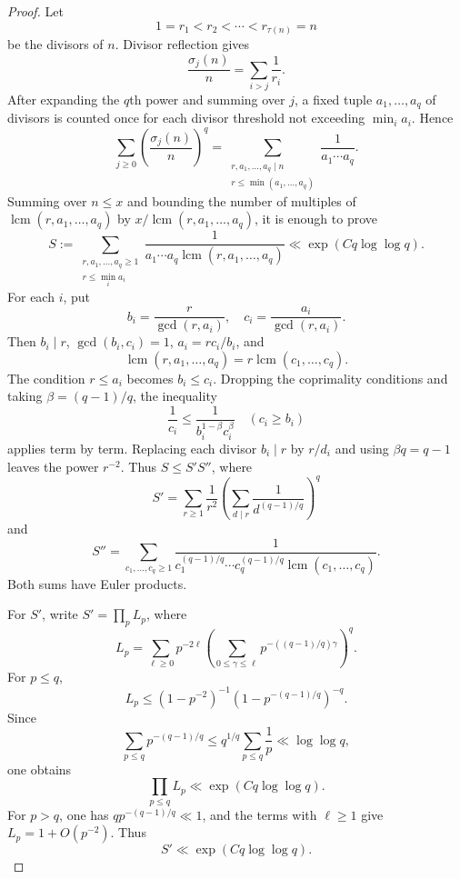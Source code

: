 \documentclass[11pt,letterpaper,reqno]{amsart}
\numberwithin{equation}{section}
\theoremstyle{remark}
\newcommand{\1}{\mathbf 1}
\DeclareMathOperator{\lcm}{lcm}
\renewcommand{\leq}{\leqslant}
\renewcommand{\geq}{\geqslant}
\begin{document}
\begin{proof}
Let
\[
 1=r_1<r_2<\cdots<r_{\tau(n)}=n
\]
be the divisors of $n$. Divisor reflection gives
\[
 \frac{\sigma_j(n)}n=\sum_{i>j}\frac1{r_i}.
\]
After expanding the $q$th power and summing over $j$, a fixed tuple
$a_1,\ldots,a_q$ of divisors is counted once for each divisor threshold not
exceeding $\min_i a_i$. Hence
\[
 \sum_{j\geq0}\left(\frac{\sigma_j(n)}n\right)^q
 =
 \sum_{\substack{r,a_1,\ldots,a_q\mid n\\
 r\leq\min(a_1,\ldots,a_q)}}
 \frac1{a_1\cdots a_q}.
\]
Summing over $n\leq x$ and bounding the number of multiples of
$\lcm(r,a_1,\ldots,a_q)$ by\linebreak
$x/\lcm(r,a_1,\ldots,a_q)$, it is enough to prove
\begin{equation}\label{eq:k-S}
 S:=\sum_{\substack{r,a_1,\ldots,a_q\geq1\\r\leq\min_i a_i}}
 \frac1{a_1\cdots a_q\lcm(r,a_1,\ldots,a_q)}
 \ll\exp(Cq\log\log q).
\end{equation}
For each $i$, put
\[
 b_i=\frac r{\gcd(r,a_i)},\quad c_i=\frac{a_i}{\gcd(r,a_i)}.
\]
Then $b_i\mid r$, $\gcd(b_i,c_i)=1$, $a_i=rc_i/b_i$, and
\[
 \lcm(r,a_1,\ldots,a_q)=r\lcm(c_1,\ldots,c_q).
\]
The condition $r\leq a_i$ becomes $b_i\leq c_i$. Dropping the coprimality
conditions and taking $\beta=(q-1)/q$, the inequality
\[
 \frac1{c_i}\leq\frac1{b_i^{1-\beta}c_i^\beta}
 \quad(c_i\geq b_i)
\]
applies term by term. Replacing each divisor $b_i\mid r$ by $r/d_i$
and using $\beta q=q-1$ leaves the power $r^{-2}$. Thus
$S\leq S'S''$, where
\[
 S'=\sum_{r\geq1}\frac1{r^2}
 \left(\sum_{d\mid r}\frac1{d^{(q-1)/q}}\right)^q
\]
and
\[
 S''=\sum_{c_1,\ldots,c_q\geq1}
 \frac1{c_1^{(q-1)/q}\cdots c_q^{(q-1)/q}\lcm(c_1,\ldots,c_q)}.
\]
Both sums have Euler products.

For $S'$, write $S'=\prod_pL_p$, where
\[
 L_p=\sum_{\ell\geq0}p^{-2\ell}
 \left(\sum_{0\leq\gamma\leq\ell}
 p^{-((q-1)/q)\gamma}\right)^q.
\]
For $p\leq q$,
\[
 L_p\leq(1-p^{-2})^{-1}(1-p^{-(q-1)/q})^{-q}.
\]
Since
\[
 \sum_{p\leq q}p^{-(q-1)/q}
 \leq q^{1/q}\sum_{p\leq q}\frac1p
 \ll\log\log q,
\]
one obtains
\[
 \prod_{p\leq q}L_p\ll\exp(Cq\log\log q).
\]
For $p>q$, one has $qp^{-(q-1)/q}\ll1$, and the terms with $\ell\geq1$
give $L_p=1+O(p^{-2})$. Thus
\begin{equation}\label{eq:k-Sprime}
 S'\ll\exp(Cq\log\log q).
\end{equation}


\end{proof}
\end{document}
